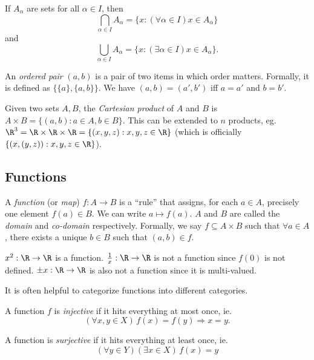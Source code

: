 \documentclass[a4paper]{article}
\begin{document}
\begin{notation}
  If $A_\alpha$ are sets for all $\alpha \in I$, then
  \[
    \bigcap_{\alpha\in I}A_\alpha = \{x: (\forall\alpha\in I) x\in A_\alpha\}
  \]
  and
  \[
    \bigcup_{\alpha\in I}A_\alpha = \{x: (\exists\alpha\in I) x\in A_\alpha\}.
  \]
\end{notation}

\begin{defi}
  An \emph{ordered pair} $(a, b)$ is a pair of two items in which order matters. Formally, it is defined as $\{\{a\}, \{a, b\}\}$. We have $(a, b) = (a', b')$ iff $a = a'$ and $b = b'$.
\end{defi}

\begin{defi}
  Given two sets $A, B$, the \emph{Cartesian product} of $A$ and $B$ is $A\times B = \{(a, b):a\in A, b\in B\}$. This can be extended to $n$ products, eg. $\R^3 = \R\times\R\times\R = \{(x,y,z): x, y, z\in \R\}$ (which is officially $\{(x, (y, z)): x, y, z\in \R\}$).
\end{defi}

\subsection{Functions}
\begin{defi}
  A \emph{function} (or \emph{map}) $f: A\to B$ is a ``rule'' that assigns, for each $a\in A$, precisely one element $f(a)\in B$. We can write $a\mapsto f(a)$. $A$ and $B$ are called the \emph{domain} and \emph{co-domain} respectively. Formally, we say $f\subseteq A\times B$ such that $\forall a\in A$, there exists a unique $b\in B$ such that $(a, b)\in f$.
\end{defi}

\begin{eg}
  $x^2: \R \to \R$ is a function. $\frac{1}{x}:\R\to\R$ is not a function since $f(0)$ is not defined. $\pm x: \R\to\R$ is also not a function since it is multi-valued.
\end{eg}

It is often helpful to categorize functions into different categories.
\begin{defi}
  A function $f$ is \emph{injective} if it hits everything at most once, ie.
  \[
    (\forall x, y\in X)\,f(x) = f(y)\Rightarrow x = y.
  \]
\end{defi}

\begin{defi}
  A function is \emph{surjective} if it hits everything at least once, ie.
  \[
    (\forall y\in Y)(\exists x\in X)\,f(x) = y
  \]
\end{defi}
\end{document}
